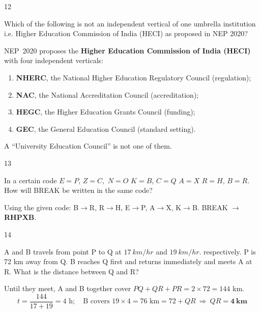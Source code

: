 \begin{question}{12}
{Which of the following is not an independent vertical of one umbrella institution i.e. Higher Education Commission of India (HECI) as proposed in NEP 2020?\par}
\begin{explain}
NEP~2020 proposes the \textbf{Higher Education Commission of India (HECI)} with four independent verticals:
\begin{enumerate}
\item \textbf{NHERC}, the National Higher Education Regulatory Council (regulation);
\item \textbf{NAC}, the National Accreditation Council (accreditation);
\item \textbf{HEGC}, the Higher Education Grants Council (funding);
\item \textbf{GEC}, the General Education Council (standard setting).
\end{enumerate}
A ``University Education Council'' is not one of them.
\end{explain}
\end{question}

\begin{question}{13}
{In a certain code $E=P$, $Z=C,$ $N=O$ $K=B$, $C=Q$ $A=X$ $R=H$, $B=R.$ How will BREAK be written in the same code?\par}
\begin{explain}
Using the given code: B$\rightarrow$R, R$\rightarrow$H, E$\rightarrow$P, A$\rightarrow$X, K$\rightarrow$B.
BREAK $\rightarrow$ \textbf{RHPXB}.
\end{explain}
\end{question}

\begin{question}{14}
{A and B travels from point P to Q at $17~km/hr$ and $19~km/hr$. respectively. P is 72 km away from Q. B reaches Q first and returns immediately and meets A at R. What is the distance between Q and R?\par}
\begin{explain}
Until they meet, A and B together cover $PQ+QR+PR=2\times72=144$ km.
\[t=\frac{144}{17+19}=4\text{ h};\quad\text{B covers }19\times4=76\text{ km}=72+QR\ \Rightarrow\ QR=\mathbf{4\ km}\]
\end{explain}
\end{question}

